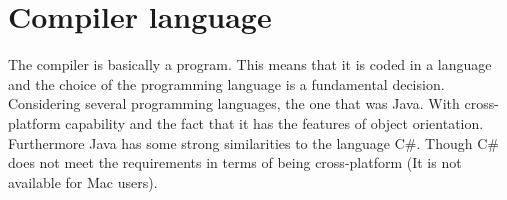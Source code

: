 \chapter{Compiler language}
The compiler is basically a program. This means that it is coded in a language and the choice of the programming language is a fundamental decision. Considering several programming languages, the one that was Java. With cross-platform capability\cite{java:requirements} and the fact that it has the features of object orientation\cite{java:object:orientation}. Furthermore Java has some strong similarities to the language C\#\cite{java:comparison}. Though C\# does not meet the requirements in terms of being cross-platform (It is not available for Mac users). 